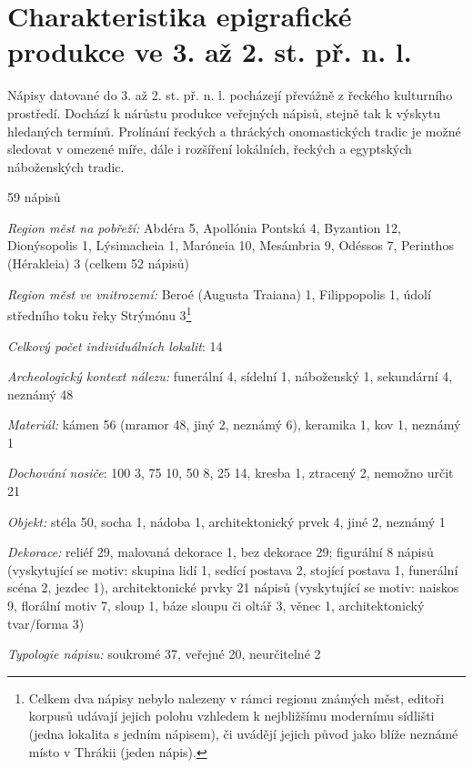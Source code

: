 
\section[charakteristika-epigrafické-produkce-ve-3.-až-2.-st.-př.-n.-l.]{Charakteristika epigrafické produkce ve 3. až 2. st. př. n. l.}

Nápisy datované do 3. až 2. st. př. n. l. pocházejí převážně z řeckého kulturního prostředí. Dochází k nárůstu produkce veřejných nápisů, stejně tak k výskytu hledaných termínů. Prolínání řeckých a thráckých onomastických tradic je možné sledovat v omezené míře, dále i rozšíření lokálních, řeckých a egyptských náboženských tradic.

\placetable[none]{}
\starttable[|l|]
\HL
{} 59 nápisů

{\em Region měst na pobřeží:} Abdéra 5, Apollónia Pontská 4, Byzantion 12, Dionýsopolis 1, Lýsimacheia 1, Maróneia 10, Mesámbria 9, Odéssos 7, Perinthos (Hérakleia) 3 (celkem 52 nápisů)

{\em Region měst ve vnitrozemí:} Beroé (Augusta Traiana) 1, Filippopolis 1, údolí středního toku řeky Strýmónu 3\footnote{Celkem dva nápisy nebylo nalezeny v rámci regionu známých měst, editoři korpusů udávají jejich polohu vzhledem k nejbližšímu modernímu sídlišti (jedna lokalita s jedním nápisem), či uvádějí jejich původ jako blíže neznámé místo v Thrákii (jeden nápis).}

{\em Celkový počet individuálních lokalit}: 14

{\em Archeologický kontext nálezu:} funerální 4, sídelní 1, náboženský 1, sekundární 4, neznámý 48

{\em Materiál:} kámen 56 (mramor 48, jiný 2, neznámý 6), keramika 1, kov 1, neznámý 1

{\em Dochování nosiče}: 100  3, 75  10, 50  8, 25  14, kresba 1, ztracený 2, nemožno určit 21

{\em Objekt:} stéla 50, socha 1, nádoba 1, architektonický prvek 4, jiné 2, neznámý 1

{\em Dekorace:} reliéf 29, malovaná dekorace 1, bez dekorace 29; figurální 8 nápisů (vyskytující se motiv: skupina lidí 1, sedící postava 2, stojící postava 1, funerální scéna 2, jezdec 1), architektonické prvky 21 nápisů (vyskytující se motiv: naiskos 9, florální motiv 7, sloup 1, báze sloupu či oltář 3, věnec 1, architektonický tvar/forma 3)

{\em Typologie nápisu:} soukromé 37, veřejné 20, neurčitelné 2

